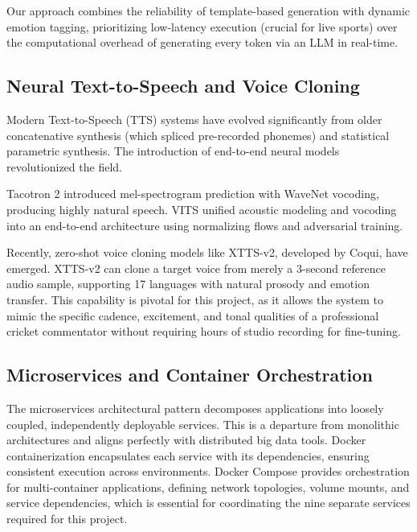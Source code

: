 \documentclass[12pt,a4paper]{article}
\begin{document}
Our approach combines the reliability of template-based generation with dynamic emotion tagging, prioritizing low-latency execution (crucial for live sports) over the computational overhead of generating every token via an LLM in real-time.

\subsection{Neural Text-to-Speech and Voice Cloning}
Modern Text-to-Speech (TTS) systems have evolved significantly from older concatenative synthesis (which spliced pre-recorded phonemes) and statistical parametric synthesis. The introduction of end-to-end neural models revolutionized the field. 

Tacotron 2 introduced mel-spectrogram prediction with WaveNet vocoding, producing highly natural speech. VITS unified acoustic modeling and vocoding into an end-to-end architecture using normalizing flows and adversarial training. 

Recently, zero-shot voice cloning models like XTTS-v2, developed by Coqui, have emerged. XTTS-v2 can clone a target voice from merely a 3-second reference audio sample, supporting 17 languages with natural prosody and emotion transfer. This capability is pivotal for this project, as it allows the system to mimic the specific cadence, excitement, and tonal qualities of a professional cricket commentator without requiring hours of studio recording for fine-tuning.

\subsection{Microservices and Container Orchestration}
The microservices architectural pattern decomposes applications into loosely coupled, independently deployable services. This is a departure from monolithic architectures and aligns perfectly with distributed big data tools. Docker containerization encapsulates each service with its dependencies, ensuring consistent execution across environments. Docker Compose provides orchestration for multi-container applications, defining network topologies, volume mounts, and service dependencies, which is essential for coordinating the nine separate services required for this project.


\newpage
\end{document}
